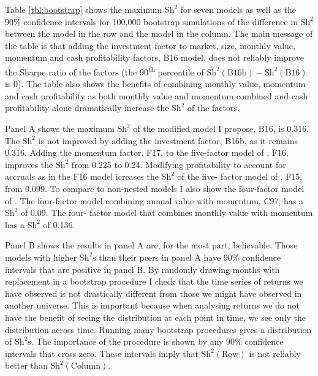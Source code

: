 
Table \ref{tbl:bootstrap} shows the maximum $\text{Sh}^2$ for seven models as well as the
90\% confidence intervals for 100,000 bootstrap simulations of the difference in
$\text{Sh}^2$ between the model in the row and the model in the column. The main message
of the table is that adding the investment factor to market, size, monthly value, momentum
and cash profitability factors, B16 model, does not reliably improve the Sharpe ratio of
the factors (the 90\textsuperscript{th} percentile of
$\text{Sh}^2(\text{B16b})-\text{Sh}^2(\text{B16})$ is 0). The table also shows the
benefits of combining monthly value, momentum and cash profitability as both monthly value
and momentum combined and cash profitability alone dramatically increase the $\text{Sh}^2$
of the factors.

Panel A shows the maximum $\text{Sh}^2$ of the modified \textcite{ball2016accruals} model
I propose, B16, is 0.316. The $\text{Sh}^2$ is not improved by adding the investment
factor, B16b, as it remains 0.316. Adding the momentum factor, F17, to the five-factor
model of \textcite{fama2016choosing}, F16, improves the $\text{Sh}^2$ from 0.225 to 0.24.
Modifying profitability to account for accruals as in the F16 model icreases the
$\text{Sh}^2$ of the five- factor model of \textcite{fama2015five}, F15, from 0.099. To
compare to non-nested models I also show the four-factor model of
\textcite{carhart1997persistence}. The four-factor model combining annual value with
momentum, C97, has a $\text{Sh}^2$ of 0.09. The four- factor model that combines monthly
value with momentum has a $\text{Sh}^2$ of 0.136.

Panel B shows the results in panel A are, for the most part, believable. Those models with
higher $\text{Sh}^2$s than their peers in panel A have 90\% confidence intervals that are
positive in panel B. By randomly drawing months with replacement in a bootstrap procedure
I check that the time series of returns we have observed is not drastically different from
those we might have observed in another universe. This is important because when analysing
returns we do not have the benefit of seeing the distribution at each point in time, we
see only the distribution across time. Running many bootstrap procedures gives a
distribution of $\text{Sh}^2$s. The importance of the procedure is shown by any 90\%
confidence intervals that cross zero. These intervals imply that $\text{Sh}^2(\text{Row})$
is not reliably better than $\text{Sh}^2(\text{Column})$.

